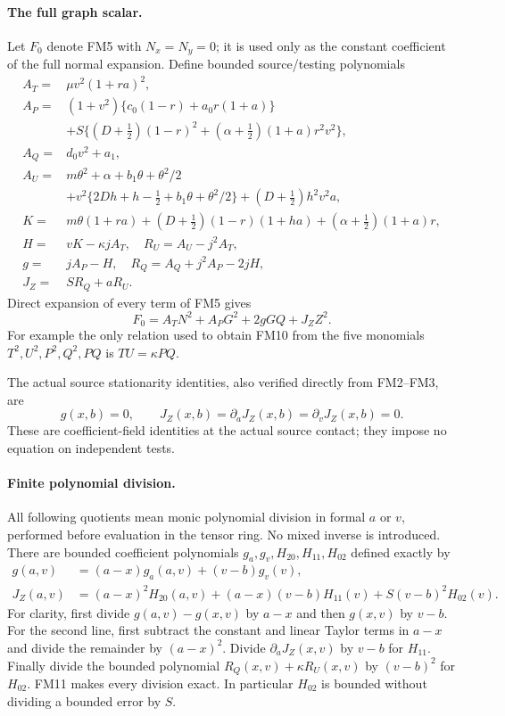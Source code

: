 \paragraph{The full graph scalar.}
Let $F_0$ denote FM5 with $N_x=N_y=0$; it is used only as the
constant coefficient of the full normal expansion. Define bounded
source/testing polynomials
\[
\begin{split}
 A_T={}&\mu v^2(1+ra)^2,\\
 A_P={}&(1+v^2)\{c_0(1-r)+a_0r(1+a)\}\\
       &+S\{(D+\tfrac12)(1-r)^2+
                   (\alpha+\tfrac12)(1+a)r^2v^2\},\\
 A_Q={}&d_0v^2+a_1,\\
 A_U={}&m\theta^2+\alpha+b_1\theta+\theta^2/2\\
       &+v^2\{2Dh+h-\tfrac12+b_1\theta+\theta^2/2\}
              +(D+\tfrac12)h^2v^2a,\\
 K={}&m\theta(1+ra)+(D+\tfrac12)(1-r)(1+ha)
                         +(\alpha+\tfrac12)(1+a)r,\\
 H={}&vK-\kappa jA_T,\quad R_U=A_U-j^2A_T,\\
 g={}&jA_P-H,\quad R_Q=A_Q+j^2A_P-2jH,\\
 J_Z={}&SR_Q+aR_U.
\end{split}\tag{FM9}
\]
Direct expansion of every term of FM5 gives
\[
 F_0=A_TN^2+A_PG^2+2gGQ+J_ZZ^2.
 \tag{FM10}
\]
For example the only relation used to obtain FM10 from the
five monomials $T^2,U^2,P^2,Q^2,PQ$ is $TU=\kappa PQ$.

The actual source stationarity identities, also verified directly
from FM2--FM3, are
\[
 g(x,b)=0,\qquad
 J_Z(x,b)=\partial_aJ_Z(x,b)=\partial_vJ_Z(x,b)=0.
 \tag{FM11}
\]
These are coefficient-field identities at the actual source
contact; they impose no equation on independent tests.

\paragraph{Finite polynomial division.}
All following quotients mean monic polynomial division in formal
$a$ or $v$, performed before evaluation in the tensor ring. No
mixed inverse is introduced. There are bounded coefficient
polynomials $g_a,g_v,H_{20},H_{11},H_{02}$ defined exactly by
\[
\begin{split}
 g(a,v)&=(a-x)g_a(a,v)+(v-b)g_v(v),\\
 J_Z(a,v)&=(a-x)^2H_{20}(a,v)+(a-x)(v-b)H_{11}(v)
                                      +S(v-b)^2H_{02}(v).
\end{split}\tag{FM12}
\]
For clarity, first divide $g(a,v)-g(x,v)$ by $a-x$ and then
$g(x,v)$ by $v-b$. For the second line, first subtract the
constant and linear Taylor terms in $a-x$ and divide the remainder
by $(a-x)^2$. Divide $\partial_aJ_Z(x,v)$ by $v-b$ for $H_{11}$.
Finally divide the bounded polynomial
$R_Q(x,v)+\kappa R_U(x,v)$ by $(v-b)^2$ for $H_{02}$.
FM11 makes every division exact. In particular $H_{02}$ is
bounded without dividing a bounded error by $S$.


